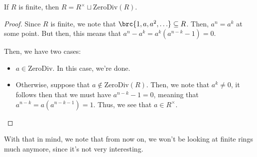 \documentclass[openany]{book}
\begin{document}
\begin{thm}
	If $R$ is finite, then $R = R^{\times} \sqcup \mathrm{ZeroDiv}(R)$.
\end{thm}
\begin{proof}
	Since $R$ is finite, we note that $\brc{1, a, a^{2}, \ldots} \subseteq R$. Then, $a^{n} = a^{k}$ at some point. But then, this means that $a^{n} - a^{k} = a^{k}(a^{n-k} - 1) = 0$.
	
	Then, we have two cases:
	\begin{itemize}
		\item $a \in \mathrm{ZeroDiv}$. In this case, we're done.
		\item Otherwise, suppose that $a \not\in \mathrm{ZeroDiv}(R)$. Then, we note that $a^{k} \neq 0$, it follows then that we must have $a^{n-k} - 1 = 0$, meaning that $a^{n-k} = a(a^{n-k-1}) = 1$. Thus, we see that $a \in R^{\times}$.
	\end{itemize}
\end{proof}

With that in mind, we note that from now on, we won't be looking at finite rings much anymore, since it's not very interesting.
\end{document}
